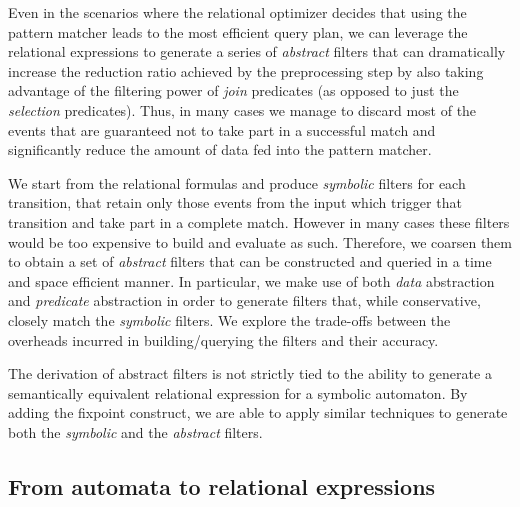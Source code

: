 Even in the scenarios where the relational optimizer decides that using the 
pattern matcher leads to the most efficient query plan, we can leverage the 
relational expressions to generate a series of {\em abstract} filters that can 
dramatically increase the reduction ratio achieved by the preprocessing step by 
also taking advantage of the filtering power of {\em join} predicates (as 
opposed to just the {\em selection} predicates).   
Thus, in many cases we manage to discard most of the events that are guaranteed 
not to take part in a successful match and significantly reduce the amount of 
data fed into the pattern matcher.

We start from the relational formulas and produce {\em symbolic} filters for 
each transition, that retain only those events from the input which trigger 
that transition and take part in a complete match.
However in many cases these filters would be too expensive to build and 
evaluate as such.
Therefore, we coarsen them to obtain a set of {\em abstract} filters
that can be constructed and queried in a time and space efficient manner.
In particular, we make use of both {\em data} abstraction and {\em predicate} 
abstraction in order to generate filters that, while conservative, closely 
match the {\em symbolic} filters. 
We explore the trade-offs between the overheads incurred in building/querying
the filters and their accuracy. 


The derivation of abstract filters is not strictly tied to the ability to 
generate a semantically equivalent relational expression for a symbolic 
automaton. By adding the fixpoint construct, we are able to apply similar 
techniques to generate both the {\em symbolic} and the {\em abstract} 
filters.


\begin{comment}
We propose three levels of abstraction.
The first enforces the join constraints between different transitions as
expressed by join predicates within the transition guards.
The second one further imposes time windowing constraints (all events of a
successful match must occur within a timeout of the first event in the match).
Finally the last one enforces ordering constraints between {\em consecutive}
transitions of the pattern.
\end{comment}

\subsection{From automata to relational expressions}

